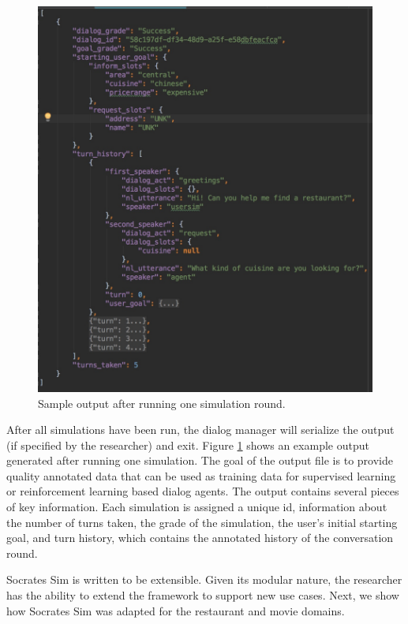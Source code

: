 \begin{figure}[h!]
	\centering
	\includegraphics[scale=.17]{diagrams/sample_save_output.jpeg}
	\caption{ Sample output after running one simulation round. }
	\label{fig:sample_output}
\end{figure}

After all simulations have been run, the dialog manager will serialize the output (if specified by the researcher) and exit. Figure \ref{fig:sample_output} shows an example output generated after running one simulation. The goal of the output file is to provide quality annotated data that can be used as training data for supervised learning or reinforcement learning based dialog agents. The output contains several pieces of key information. Each simulation is assigned a unique id, information about the number of turns taken, the grade of the simulation, the user's initial starting goal, and turn history, which contains the annotated history of the conversation round. 

Socrates Sim is written to be extensible. Given its modular nature, the researcher has the ability to extend the framework to support new use cases. Next, we show how Socrates Sim was adapted for the restaurant and movie domains. 


